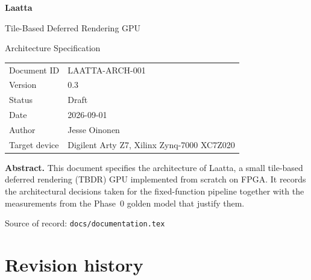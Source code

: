 \documentclass[11pt,a4paper]{article}
\newcommand{\docID}{LAATTA-ARCH-001}
\newcommand{\docVersion}{0.3}
\newcommand{\docStatus}{Draft}
\newcommand{\docDate}{2026-09-01}
\newcommand{\docAuthor}{Jesse Oinonen}
\begin{document}
\begin{titlepage}
\centering
\vspace*{2cm}

{\Huge\bfseries Laatta\par}
\vspace{0.6cm}
{\LARGE Tile-Based Deferred Rendering GPU\par}
\vspace{0.3cm}
{\Large Architecture Specification\par}

\vspace{2.5cm}

\begin{tabular}{@{}ll@{}}
\toprule
Document ID   & \docID \\
Version       & \docVersion \\
Status        & \docStatus \\
Date          & \docDate \\
Author        & \docAuthor \\
Target device & Digilent Arty Z7, Xilinx Zynq-7000 XC7Z020 \\
\bottomrule
\end{tabular}

\vspace{2.5cm}

\begin{minipage}{0.85\textwidth}
\small
\textbf{Abstract.}\quad
This document specifies the architecture of Laatta, a small tile-based deferred
rendering (TBDR) GPU implemented from scratch on FPGA. It records the
architectural decisions taken for the fixed-function pipeline together with the
measurements from the Phase~0 golden model that justify them.
\end{minipage}

\vfill
{\small Source of record: \texttt{docs/documentation.tex}}
\end{titlepage}

\section*{Revision history}
\end{document}
